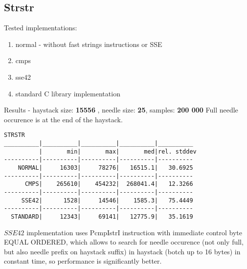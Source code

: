 \documentclass[11pt,a4paper]{article}
\begin{document}
\subsection{Strstr}\label{subsec:strstr}
    Tested implementations:
    \begin{enumerate}
        \item normal - without fast strings instructions or SSE
        \item cmps
        \item sse42
        \item standard C library implementation
    \end{enumerate}
Results - haystack size: \textbf{15556} , needle size: \textbf{25}, samples: \textbf{200 000} \newline
Full needle occurence is at the end of the haystack.
\begin{lstlisting}[]
STRSTR
__________|__________|__________|__________|__________
          |       min|       max|       med|rel. stddev
----------|----------|----------|----------|----------
    NORMAL|     16303|     78276|   16515.1|   30.6925
----------|----------|----------|----------|----------
      CMPS|    265610|    454232|  268041.4|   12.3266
----------|----------|----------|----------|----------
     SSE42|      1528|     14546|    1585.3|   75.4449
----------|----------|----------|----------|----------
  STANDARD|     12343|     69141|   12775.9|   35.1619
\end{lstlisting}
$SSE42$ implementation uses PcmpIstrI instruction with immediate control byte EQUAL ORDERED, which allows to search for needle occurence (not only full, but also needle prefix on haystack suffix) in haystack (botch up to 16 bytes) in constant time, so performance is significantly better.
\end{document}
